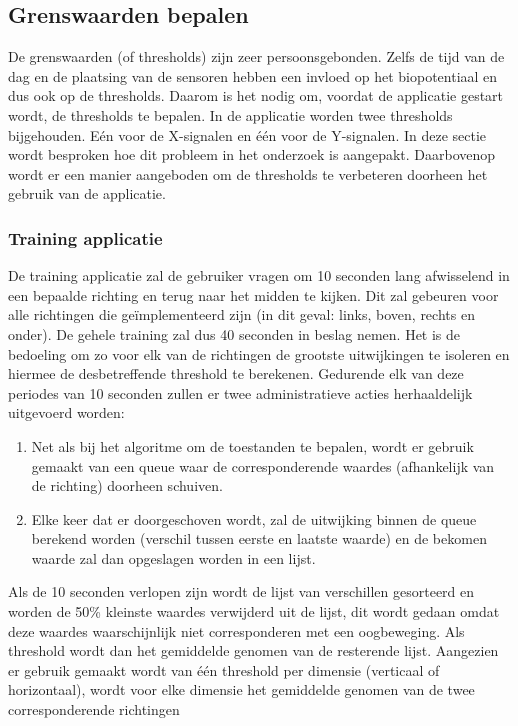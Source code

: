 \documentclass{article}
\begin{document}
\subsection{Grenswaarden bepalen}
De grenswaarden (of thresholds) zijn zeer persoonsgebonden. Zelfs de tijd van de dag en de plaatsing van de sensoren hebben een invloed op het biopotentiaal en dus ook op de thresholds. Daarom is het nodig om, voordat de applicatie gestart wordt, de thresholds te bepalen. In de applicatie worden twee thresholds bijgehouden. E\'en voor de X-signalen en \'e\'en voor de Y-signalen. In deze sectie wordt besproken hoe dit probleem in het onderzoek is aangepakt. Daarbovenop wordt er een manier aangeboden om de thresholds te verbeteren doorheen het gebruik van de applicatie.
\subsubsection{Training applicatie}
De training applicatie zal de gebruiker vragen om 10 seconden lang afwisselend in een bepaalde richting  en terug naar het midden te kijken. Dit zal gebeuren voor alle richtingen die geïmplementeerd zijn (in dit geval: links, boven, rechts en onder).
De gehele training zal dus 40 seconden in beslag nemen. Het is de bedoeling om zo voor elk van de richtingen de grootste uitwijkingen te isoleren en hiermee de desbetreffende threshold te berekenen. Gedurende elk van deze periodes van 10 seconden zullen er twee administratieve acties herhaaldelijk uitgevoerd worden:
\begin{enumerate}
	\item Net als bij het algoritme om de toestanden te bepalen, wordt er gebruik gemaakt van een queue waar de corresponderende waardes (afhankelijk van de richting) doorheen schuiven.
	\item Elke keer dat er doorgeschoven wordt, zal de uitwijking binnen de queue berekend worden (verschil tussen eerste en laatste waarde) en de bekomen waarde zal dan opgeslagen worden in een lijst.
\end{enumerate}
Als de 10 seconden verlopen zijn wordt de lijst van verschillen gesorteerd en worden de 50\% kleinste waardes verwijderd uit de lijst, dit wordt gedaan omdat deze waardes waarschijnlijk niet corresponderen met een oogbeweging. Als threshold wordt dan het gemiddelde genomen van de resterende lijst. Aangezien er gebruik gemaakt wordt van \'e\'en threshold per dimensie (verticaal of horizontaal), wordt voor elke dimensie het gemiddelde genomen van de twee corresponderende richtingen 
\end{document}
